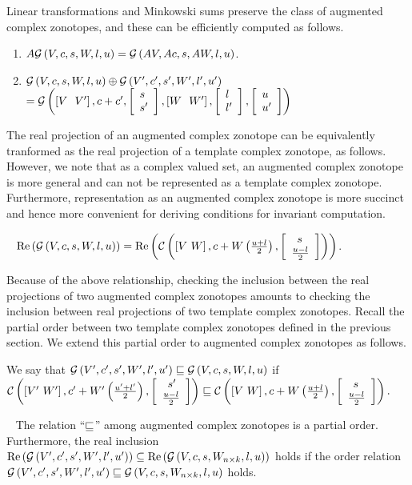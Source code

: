 %
Linear transformations and Minkowski sums preserve the class of
augmented complex zonotopes, and these can be efficiently computed as
follows.
%
\begin{lemma}
\begin{enumerate}
\item $A\mathcal{G}\left(V,c,s,W,l,u\right) = \mathcal{G}\left(AV,Ac,s,AW,l,u\right)$.
\item $\mathcal{G}\left(V,c,s,W,l,u\right)\oplus
  \mathcal{G}\left(V^\prime,c^\prime,s^\prime,W^\prime,l^\prime,u^\prime\right)$\\
$= \mathcal{G}\left(\left[V~~V^\prime\right],c+c^\prime,\left[\begin{array}{l}{s}\\{s^\prime} \end{array}\right],\left[W~~W^\prime\right],\left[\begin{array}{l}{l}\\{l^\prime} \end{array}\right],\left[\begin{array}{l}{u}\\{u^\prime} \end{array}\right]\right)$
\end{enumerate}
\end{lemma}
%
The real projection of an augmented complex zonotope can be
equivalently tranformed as the real projection of a template complex
zonotope, as follows.  However, we note that as a complex valued set,
an augmented complex zonotope is more general and can not be
represented as a template complex zonotope.  Furthermore,
representation as an augmented complex zonotope is more succinct and
hence more convenient for deriving conditions for invariant
computation.
%
\begin{lemma}~\label{lem:conversion}
$\operatorname{\operatorname{Re}}\left(\mathcal{G}\left(V,c,s,W,l,u\right)\right) = \operatorname{\operatorname{Re}}\left(\mathcal{C}\left(\left[V~W\right],c+W\left(\frac{u+l}{2}\right),\left[\begin{array}{l}{\hspace{0.5em}s}\\{\frac{u-l}{2}} \end{array}\right]\right)\right)$.
\end{lemma}
%
Because of the above relationship, checking the inclusion between the
real projections of two augmented complex zonotopes amounts to
checking the inclusion between real projections of two template
complex zonotopes.  Recall the partial order between two template
complex zonotopes defined in the previous section. We extend this
partial order to augmented complex zonotopes as follows.
%
\begin{definition}
We say that $\mathcal{G}\left(V^\prime,c^\prime,s^\prime,W^\prime,l^\prime,u^\prime\right)\sqsubseteq
\mathcal{G}\left(V,c,s,W,l,u\right)$ if\\ $\mathcal{C}\left(\left[V^\prime~W^\prime\right],c^\prime+W^\prime\left(\frac{u^\prime+l^\prime}{2}\right),\left[\begin{array}{l}{\hspace{0.5em}s^\prime}\\{\frac{u-l}{2}} \end{array}\right]\right)
\sqsubseteq
\mathcal{C}\left(\left[V~W\right],c+W\left(\frac{u+l}{2}\right),\left[\begin{array}{l}{\hspace{0.5em}s}\\{\frac{u-l}{2}} \end{array}\right]\right).$
\end{definition}
%
\begin{lemma}~\label{lem:gcz-gcz} The relation ``$\sqsubseteq$'' among
augmented complex zonotopes is a partial order.  Furthermore, the real
inclusion\\
$\operatorname{\operatorname{Re}}\left(\mathcal{G}\left(V^\prime,c^\prime,s^\prime,W^\prime,l^\prime,u^\prime\right)\right)\subseteq \operatorname{\operatorname{Re}}\left(\mathcal{G}\left(V,c,s,W_{n\times
k},l,u\right)\right)$ holds if the order relation
$\mathcal{G}\left(V^\prime,c^\prime,s^\prime,W^\prime,l^\prime,u^\prime\right)\sqsubseteq \mathcal{G}\left(V,c,s,W_{n\times
k},l,u\right)$ holds.
\end{lemma}

